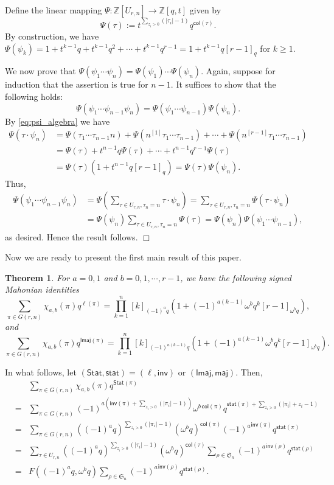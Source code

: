 \documentclass[a4paper, reqno, 11pt]{amsart}
\newtheorem{thm}[lem]{Theorem}
\newcommand{\Stat}{{\textsf{Stat}}}
\newcommand{\stat}{{\textsf{stat}}}
\newcommand{\maj}{{\textsf{maj}}}
\newcommand{\inv}{{\textsf{inv}}}
\newcommand{\lmaj}{{\textsf{lmaj}}}
\newcommand{\col}{{\textsf{col}}}
\numberwithin{equation}{section}
\def\proof{\noindent{\bf Proof.\quad}}
\def\qed{\hspace*{\fill} $\Box$ \medskip}
\begin{document}
Define the linear mapping $\Psi:\mathbb{Z}[U_{r,n}]\to\mathbb{Z}[q,t]$ given by
$$\Psi(\tau) := t^{\sum_{z_i>0}(|\tau_i|-1)}q^{\col(\tau)}.$$
By construction, we have $\Psi(\psi_k)=1+t^{k-1}q+t^{k-1}q^2+\cdots+t^{k-1}q^{r-1}=1+t^{k-1}q[r-1]_q$ for $k\geq 1$.

We now prove that $\Psi(\psi_1\cdots\psi_n)=\Psi(\psi_1)\cdots\Psi(\psi_n)$.
Again, suppose for induction that the assertion is true for $n-1$.
It suffices to show that the following holds:
$$\Psi(\psi_1\cdots\psi_{n-1}\psi_{n})=\Psi(\psi_1\cdots\psi_{n-1})\Psi(\psi_n).$$
By \eqref{eq:psi_algebra} we have
\begin{align*}
\Psi(\tau\cdot\psi_n)
&=\Psi(\tau_1\cdots\tau_{n-1}n)+\Psi(n^{[1]}\tau_1\cdots\tau_{n-1})+\cdots+\Psi(n^{[r-1]}\tau_1\cdots\tau_{n-1})\\
&=\Psi(\tau)+t^{n-1}q\Psi(\tau)+\cdots+t^{n-1}q^{r-1}\Psi(\tau)\\
&=\Psi(\tau)\left(1+t^{n-1}q[r-1]_q\right)=\Psi(\tau)\Psi(\psi_n).
\end{align*}
Thus,
\begin{align*}
\Psi(\psi_1\cdots\psi_{n-1}\psi_{n})
&=\Psi\left(\sum_{\tau\in U_{r,n},\tau_n=n}\tau\cdot\psi_n\right)
=\sum_{\tau\in U_{r,n},\tau_n=n}\Psi(\tau\cdot\psi_n)\\
&=\Psi(\psi_n)\sum_{\tau\in U_{r,n},\tau_n=n}\Psi(\tau)
=\Psi(\psi_n)\Psi(\psi_1\cdots\psi_{n-1}),
\end{align*}
as desired.
Hence the result follows. \qed


Now we are ready to present the first main result of this paper.

\begin{thm}\label{thm:G_length}
For $a=0,1$ and $b=0,1,\cdots, r-1$, we have the following signed Mahonian identities
\begin{equation}\label{eq:r_length}
\sum_{\pi\in G(r,n)} \chi_{a,b}(\pi)q^{\ell(\pi)} = \prod_{k=1}^n[k]_{(-1)^aq}\left(1+(-1)^{a(k-1)}\omega^bq^k[r-1]_{\omega^bq}\right),
\end{equation}
and
\begin{equation}\label{eq:r_lmaj}
\sum_{\pi\in G(r,n)} \chi_{a,b}(\pi)q^{\lmaj(\pi)} = \prod_{k=1}^n[k]_{(-1)^{a(k-1)}q} \left(1+(-1)^{a(k-1)}\omega^bq^k[r-1]_{\omega^bq}\right).
\end{equation}
\end{thm}
\proof
In what follows, let $(\Stat,\stat)=(\ell,\inv)$ or $(\lmaj,\maj)$.
Then,
\begin{eqnarray*}
&&\sum_{\pi\in G(r,n)} \chi_{a,b}(\pi)q^{\Stat(\pi)}\\
&=&\sum_{\pi\in G(r,n)}(-1)^{a(\inv(\pi)+\sum_{z_i>0}(|\pi_i|-1))}\omega^{b\,\col(\pi)}q^{\stat(\pi)+\sum_{z_i> 0}(|\pi_i|+z_i-1)}\\
&=&\sum_{\pi\in G(r,n)}\left((-1)^aq\right)^{\sum_{z_i>0}(|\pi_i|-1)} (\omega^bq)^{\col(\pi)}{(-1)^a}^{\inv(\pi)}q^{\stat(\pi)}\\
&=&\sum_{\tau\in U_{r,n}}\left((-1)^aq\right)^{\sum_{z_i>0}(|\tau_i|-1)}(\omega^bq)^{\col(\tau)}\sum_{\rho\in \mathfrak{S}_n}{(-1)^a}^{\inv(\rho)}q^{\stat(\rho)}\\
&=&F((-1)^aq,\omega^bq)\sum_{\rho\in \mathfrak{S}_n}{(-1)^a}^{\inv(\rho)}q^{\stat(\rho)}.
\end{eqnarray*}
\end{document}
